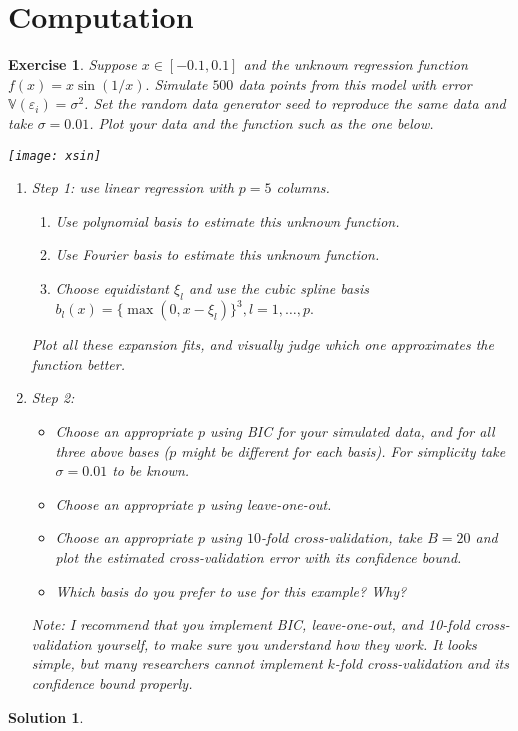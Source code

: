 \documentclass[12pt,a4paper]{article}
\def \V {\mathbb{V}}
\newtheorem{exercise}{Exercise}
\numberwithin{exercise}{section} %
\newtheorem{solution}{Solution}
\numberwithin{solution}{section} %
\begin{document}
\newpage
\section{Computation}

\begin{exercise}
Suppose $x\in[-0.1 , 0.1]$ and the unknown regression function $f(x)=x\sin(1/x).$ Simulate $500$ data points from this model with  error $\V(\varepsilon_i)=\sigma^2$. Set the random data generator seed to reproduce the same data and take $\sigma=0.01$. Plot your data and the function such as the one below.\\
\begin{center}
\texttt{[image: xsin]}
\end{center}
\begin{enumerate}
\item Step 1: use linear regression with $p=5$ columns.
\begin{enumerate}
\item Use polynomial basis to estimate this unknown function.
\item Use Fourier basis to estimate this unknown function.
\item Choose equidistant $\xi_l$ and use the cubic spline basis $b_l(x)=\{\max(0,x-\xi_l)\}^3, l=1,\ldots,p.$ 
\end{enumerate}
Plot all these expansion fits, and visually judge which one approximates the function better.\\
\item Step 2: 
\begin{itemize}
\item Choose an appropriate $p$ using BIC for your simulated data, and for all three above bases ($p$ might be different for each basis). For simplicity take $\sigma=0.01$ to be known.
\item Choose an appropriate $p$ using leave-one-out.
\item Choose an appropriate $p$ using $10$-fold cross-validation, take $B=20$ and plot the estimated cross-validation error with its confidence bound.
\item Which basis do you prefer to use for this example? Why?
\end{itemize}
Note: I recommend that you implement BIC, leave-one-out, and 10-fold cross-validation yourself, to make sure you understand how they work. It looks simple, but many researchers cannot implement $k$-fold cross-validation and its confidence bound properly.
\end{enumerate}

\end{exercise}

\begin{solution}
\end{solution}
\end{document}
